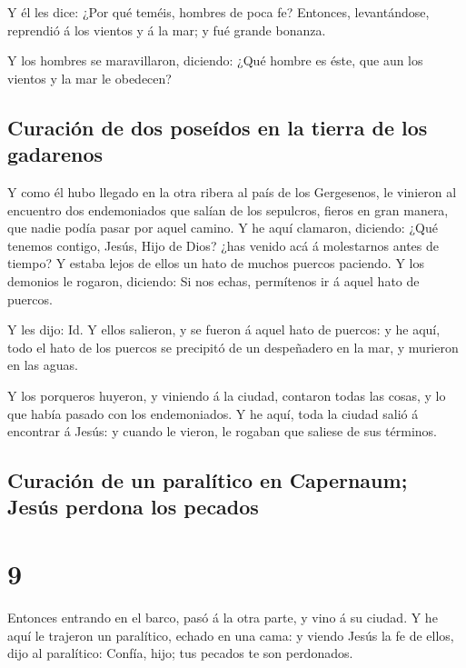  Y él les dice: ¿Por qué teméis, hombres de poca fe?
Entonces, levantándose, reprendió á los vientos y á la mar; y fué grande
bonanza.

 Y los hombres se maravillaron, diciendo: ¿Qué hombre es
éste, que aun los vientos y la mar le obedecen?

\hypertarget{curaciuxf3n-de-dos-poseuxeddos-en-la-tierra-de-los-gadarenos}{%
\subsection{Curación de dos poseídos en la tierra de los
gadarenos}\label{curaciuxf3n-de-dos-poseuxeddos-en-la-tierra-de-los-gadarenos}}

 Y como él hubo llegado en la otra ribera al país de los
Gergesenos, le vinieron al encuentro dos endemoniados que salían de los
sepulcros, fieros en gran manera, que nadie podía pasar por aquel
camino.  Y he aquí clamaron, diciendo: ¿Qué tenemos
contigo, Jesús, Hijo de Dios? ¿has venido acá á molestarnos antes de
tiempo?  Y estaba lejos de ellos un hato de muchos puercos
paciendo.  Y los demonios le rogaron, diciendo: Si nos
echas, permítenos ir á aquel hato de puercos.

 Y les dijo: Id. Y ellos salieron, y se fueron á aquel hato
de puercos: y he aquí, todo el hato de los puercos se precipitó de un
despeñadero en la mar, y murieron en las aguas.

 Y los porqueros huyeron, y viniendo á la ciudad, contaron
todas las cosas, y lo que había pasado con los endemoniados.
 Y he aquí, toda la ciudad salió á encontrar á Jesús: y
cuando le vieron, le rogaban que saliese de sus términos.

\hypertarget{curaciuxf3n-de-un-paraluxedtico-en-capernaum-jesuxfas-perdona-los-pecados}{%
\subsection{Curación de un paralítico en Capernaum; Jesús perdona los
pecados}\label{curaciuxf3n-de-un-paraluxedtico-en-capernaum-jesuxfas-perdona-los-pecados}}

\hypertarget{section-8}{%
\section{9}\label{section-8}}

 Entonces entrando en el barco, pasó á la otra parte, y vino
á su ciudad.  Y he aquí le trajeron un paralítico, echado en
una cama: y viendo Jesús la fe de ellos, dijo al paralítico: Confía,
hijo; tus pecados te son perdonados.

